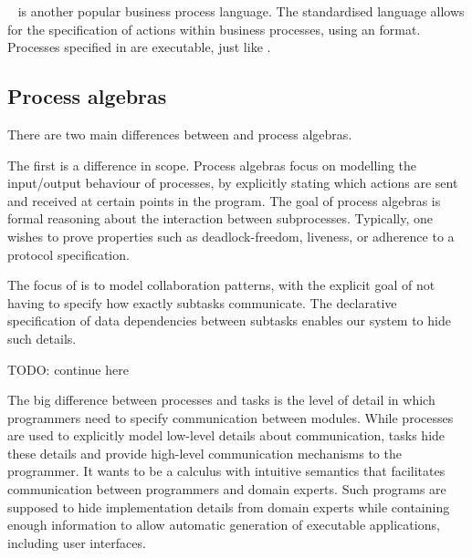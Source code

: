 \BPEL~\cite{bpel} is another popular business process language. The standardised
language allows for the specification of actions within business processes,
using an \XML format. Processes specified in \BPEL are executable, just like \YAWL.



\subsection{Process algebras}

There are two main differences between \TOP and process algebras.

The first is a difference in scope.
Process algebras focus on modelling the input/output behaviour of processes, by explicitly stating which actions are sent and received at certain points in the program.
The goal of process algebras is formal reasoning about the interaction between subprocesses.
Typically, one wishes to prove properties such as deadlock-freedom, liveness, or adherence to a protocol specification.

The focus of \TOP is to model collaboration patterns, with the explicit goal of not having to specify how exactly subtasks communicate.
The declarative specification of data dependencies between subtasks enables our system to hide such details.

TODO: continue here



%
The big difference between processes and tasks is the level of detail in which programmers need to specify communication between modules.
While processes are used to explicitly model low-level details about communication, tasks hide these details and provide high-level communication mechanisms to the programmer.
It wants to be a calculus with intuitive semantics that facilitates communication between programmers and domain experts.
Such programs are supposed to hide implementation details from domain experts while containing enough information to allow automatic generation of executable applications, including user interfaces.



